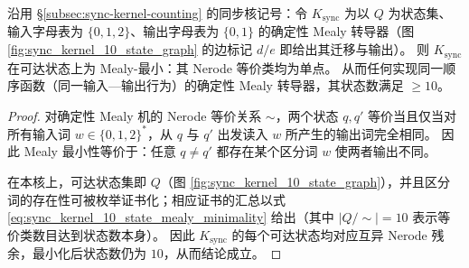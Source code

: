 \begin{theorem}\label{thm:sync-kernel-mealy-minimality}
沿用 \S\ref{subsec:sync-kernel-counting} 的同步核记号：令 \(K_{\mathrm{sync}}\) 为以 \(Q\) 为状态集、输入字母表为 \(\{0,1,2\}\)、输出字母表为 \(\{0,1\}\) 的确定性 Mealy 转导器（图 \ref{fig:sync_kernel_10_state_graph} 的边标记 \(d/e\) 即给出其迁移与输出）。
则 \(K_{\mathrm{sync}}\) 在可达状态上为 Mealy-最小：其 Nerode 等价类均为单点。
从而任何实现同一顺序函数（同一输入—输出行为）的确定性 Mealy 转导器，其状态数满足 \(\ge 10\)。
\end{theorem}

\begin{proof}
对确定性 Mealy 机的 Nerode 等价关系 \(\sim\)，两个状态 \(q,q'\) 等价当且仅当对所有输入词 \(w\in\{0,1,2\}^\ast\)，从 \(q\) 与 \(q'\) 出发读入 \(w\) 所产生的输出词完全相同。
因此 Mealy 最小性等价于：任意 \(q\neq q'\) 都存在某个区分词 \(w\) 使两者输出不同。
\par
在本核上，可达状态集即 \(Q\)（图 \ref{fig:sync_kernel_10_state_graph}），并且区分词的存在性可被枚举证书化；相应证书的汇总以式 \ref{eq:sync_kernel_10_state_mealy_minimality} 给出（其中 \(|Q/\!\sim|=10\) 表示等价类数目达到状态数本身）。
因此 \(K_{\mathrm{sync}}\) 的每个可达状态均对应互异 Nerode 残余，最小化后状态数仍为 \(10\)，从而结论成立。
\end{proof}

\endinput

